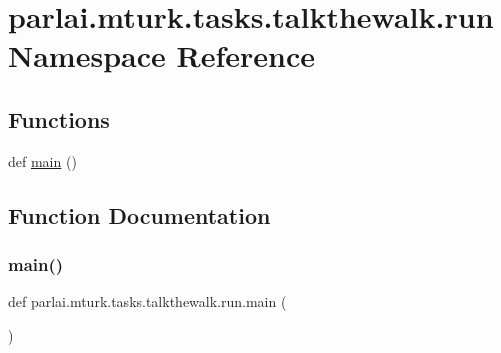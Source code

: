 \hypertarget{namespaceparlai_1_1mturk_1_1tasks_1_1talkthewalk_1_1run}{}\section{parlai.\+mturk.\+tasks.\+talkthewalk.\+run Namespace Reference}
\label{namespaceparlai_1_1mturk_1_1tasks_1_1talkthewalk_1_1run}
\subsection*{Functions}
\begin{DoxyCompactItemize}
\item 
def \hyperlink{namespaceparlai_1_1mturk_1_1tasks_1_1talkthewalk_1_1run_aa3dad7cff29347fafebfb3c91efee8cd}{main} ()
\end{DoxyCompactItemize}


\subsection{Function Documentation}
\mbox{\label{namespaceparlai_1_1mturk_1_1tasks_1_1talkthewalk_1_1run_aa3dad7cff29347fafebfb3c91efee8cd}} 
\subsubsection{\texorpdfstring{main()}{main()}}
{\footnotesize\ttfamily def parlai.\+mturk.\+tasks.\+talkthewalk.\+run.\+main (\begin{DoxyParamCaption}{ }\end{DoxyParamCaption})}

